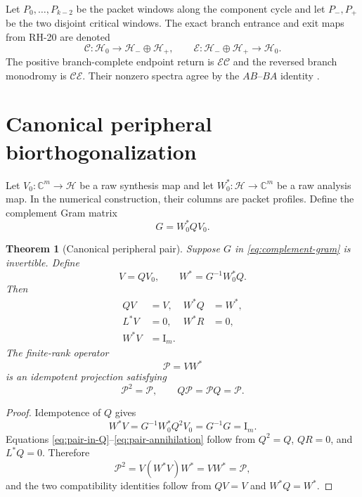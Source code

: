 \documentclass[11pt]{article}
\newtheorem{theorem}{Theorem}[section]
\theoremstyle{definition}
\theoremstyle{remark}
\newcommand{\C}{\mathbb C}
\newcommand{\Id}{\mathrm I}
\newcommand{\cC}{\mathcal C}
\newcommand{\cE}{\mathcal E}
\newcommand{\cH}{\mathcal H}
\newcommand{\cP}{\mathcal P}
\begin{document}
Let $P_0,\ldots,P_{k-2}$ be the packet windows along the component cycle and
let $P_-,P_+$ be the two disjoint critical windows.  The exact branch
entrance and exit maps from RH-20 are denoted
\begin{equation}\label{eq:branch-maps}
 \cC:\cH_0\longrightarrow\cH_-\oplus\cH_+,
 \qquad
 \cE:\cH_-\oplus\cH_+\longrightarrow\cH_0.
\end{equation}
The positive branch-complete endpoint return is $\cE\cC$ and the reversed
branch monodromy is $\cC\cE$.  Their nonzero spectra agree by the
$AB$--$BA$ identity \citep{GohbergKrein1969}.

\section{Canonical peripheral biorthogonalization}
\label{sec:canonical-pair}

Let $V_0:\C^m\to\cH$ be a raw synthesis map and let
$W_0^*:\cH\to\C^m$ be a raw analysis map.  In the numerical construction,
their columns are packet profiles.  Define the complement Gram matrix
\begin{equation}\label{eq:complement-gram}
 G=W_0^*QV_0.
\end{equation}

\begin{theorem}[Canonical peripheral pair]
\label{thm:canonical-pair}
Suppose $G$ in \eqref{eq:complement-gram} is invertible.  Define
\begin{equation}\label{eq:canonical-pair}
 \boxed{
 V=QV_0,
 \qquad
 W^*=G^{-1}W_0^*Q.}
\end{equation}
Then
\begin{align}
 QV&=V,
 &W^*Q&=W^*,
 \label{eq:pair-in-Q}\\
 L^*V&=0,
 &W^*R&=0,
 \label{eq:pair-annihilation}\\
 W^*V&=\Id_m.
 \label{eq:pair-duality}
\end{align}
The finite-rank operator
\begin{equation}\label{eq:packet-projection}
 \cP=VW^*
\end{equation}
is an idempotent projection satisfying
\begin{equation}\label{eq:projection-compatible}
 \cP^2=\cP,
 \qquad
 Q\cP=\cP Q=\cP.
\end{equation}
\end{theorem}

\begin{proof}
Idempotence of $Q$ gives
\[
 W^*V
 =G^{-1}W_0^*Q^2V_0
 =G^{-1}G
 =\Id_m.
\]
Equations \eqref{eq:pair-in-Q}--\eqref{eq:pair-annihilation} follow from
$Q^2=Q$, $QR=0$, and $L^*Q=0$.  Therefore
\[
 \cP^2=V(W^*V)W^*=VW^*=\cP,
\]
and the two compatibility identities follow from
$QV=V$ and $W^*Q=W^*$.
\end{proof}
\end{document}
